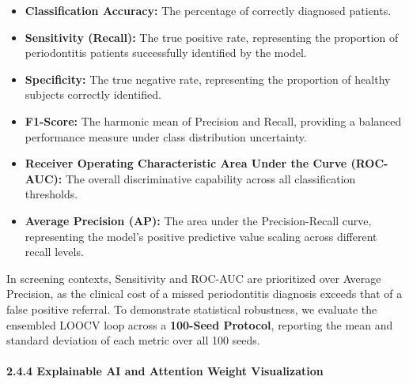 \documentclass[
]{article}
\providecommand{\tightlist}{%
  \setlength{\itemsep}{0pt}\setlength{\parskip}{0pt}}
\begin{document}
\begin{itemize}
\tightlist
\item
  \textbf{Classification Accuracy:} The percentage of correctly
  diagnosed patients.
\item
  \textbf{Sensitivity (Recall):} The true positive rate, representing
  the proportion of periodontitis patients successfully identified by
  the model.
\item
  \textbf{Specificity:} The true negative rate, representing the
  proportion of healthy subjects correctly identified.
\item
  \textbf{F1-Score:} The harmonic mean of Precision and Recall,
  providing a balanced performance measure under class distribution
  uncertainty.
\item
  \textbf{Receiver Operating Characteristic Area Under the Curve
  (ROC-AUC):} The overall discriminative capability across all
  classification thresholds.
\item
  \textbf{Average Precision (AP):} The area under the Precision-Recall
  curve, representing the model's positive predictive value scaling
  across different recall levels.
\end{itemize}

In screening contexts, Sensitivity and ROC-AUC are prioritized over
Average Precision, as the clinical cost of a missed periodontitis
diagnosis exceeds that of a false positive referral. To demonstrate
statistical robustness, we evaluate the ensembled LOOCV loop across a
\textbf{100-Seed Protocol}, reporting the mean and standard deviation of
each metric over all 100 seeds.

\paragraph{\texorpdfstring{\textbf{2.4.4 Explainable AI and Attention
Weight
Visualization}}{2.4.4 Explainable AI and Attention Weight Visualization}}\label{explainable-ai-and-attention-weight-visualization}
\end{document}
